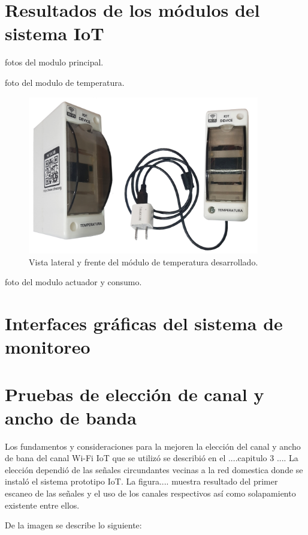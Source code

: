 \section{Resultados de los módulos del sistema IoT}

fotos del modulo principal.

foto del modulo de temperatura.

\begin{figure}[htpb]
\centering 
\includegraphics[width=0.9\textwidth]{./Figures/moduloTemp.png}
\caption{Vista lateral y frente del módulo de temperatura desarrollado.}
\label{fig:modtemp}
\end{figure}

foto del modulo actuador y consumo.


\section{Interfaces gráficas del sistema de monitoreo}

\section{Pruebas de elección de canal y ancho de banda}


Los fundamentos y consideraciones para la mejoren la elección del canal y ancho de bana del canal Wi-Fi IoT que se utilizó se describió en el ....capitulo 3 .... La elección dependió de las señales circundantes vecinas a la red domestica donde se instaló el sistema prototipo IoT. La figura.... muestra resultado del primer escaneo de las señales y el uso de los canales respectivos así como solapamiento existente entre ellos. 

De la imagen se describe lo siguiente:

